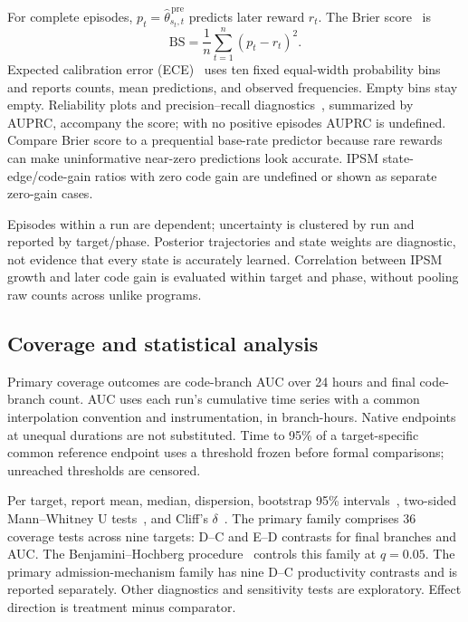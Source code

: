 \documentclass[final,5p,times,number]{elsarticle}
\begin{document}
For complete episodes, $p_t=\widehat{\theta}_{s_t,t}^{\,\mathrm{pre}}$ predicts later reward $r_t$. The Brier score~\cite{brier1950} is
\begin{equation}
\mathrm{BS}=\frac{1}{n}\sum_{t=1}^{n}(p_t-r_t)^2.
\end{equation}
Expected calibration error (ECE)~\cite{guo2017calibration} uses ten fixed equal-width probability bins and reports counts, mean predictions, and observed frequencies. Empty bins stay empty. Reliability plots and precision--recall diagnostics~\cite{davis2006pr}, summarized by AUPRC, accompany the score; with no positive episodes AUPRC is undefined. Compare Brier score to a prequential base-rate predictor because rare rewards can make uninformative near-zero predictions look accurate. IPSM state-edge/code-gain ratios with zero code gain are undefined or shown as separate zero-gain cases.

Episodes within a run are dependent; uncertainty is clustered by run and reported by target/phase. Posterior trajectories and state weights are diagnostic, not evidence that every state is accurately learned. Correlation between IPSM growth and later code gain is evaluated within target and phase, without pooling raw counts across unlike programs.

\subsection{Coverage and statistical analysis}
Primary coverage outcomes are code-branch AUC over 24 hours and final code-branch count. AUC uses each run's cumulative time series with a common interpolation convention and instrumentation, in branch-hours. Native endpoints at unequal durations are not substituted. Time to 95\% of a target-specific common reference endpoint uses a threshold frozen before formal comparisons; unreached thresholds are censored.

Per target, report mean, median, dispersion, bootstrap 95\% intervals~\cite{efron1979}, two-sided Mann--Whitney U tests~\cite{mann1947}, and Cliff's $\delta$~\cite{cliff1993}. The primary family comprises 36 coverage tests across nine targets: D--C and E--D contrasts for final branches and AUC. The Benjamini--Hochberg procedure~\cite{benjamini1995} controls this family at $q=0.05$. The primary admission-mechanism family has nine D--C productivity contrasts and is reported separately. Other diagnostics and sensitivity tests are exploratory. Effect direction is treatment minus comparator.
\end{document}
